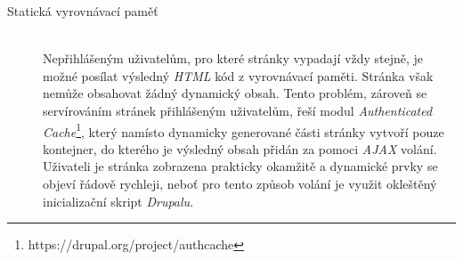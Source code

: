\begin{description}
  \item[Statická vyrovnávací paměť] \hfill \\
  Nepřihlášeným uživatelům, pro které stránky vypadají vždy stejně, je možné posílat výsledný \emph{HTML} kód z vyrovnávací paměti. Stránka však nemůže obsahovat žádný dynamický obsah. Tento problém, zároveň se servírováním stránek přihlášeným uživatelům, řeší modul \emph{Authenticated Cache}\footnote{https://drupal.org/project/authcache}, který namísto dynamicky generované části stránky vytvoří pouze kontejner, do kterého je výsledný obsah přidán za pomoci \emph{AJAX} volání. Uživateli je stránka zobrazena prakticky okamžitě a dynamické prvky se objeví řádově rychleji, neboť pro tento způsob volání je využit okleštěný inicializační skript \emph{Drupalu}.
\end{description}
